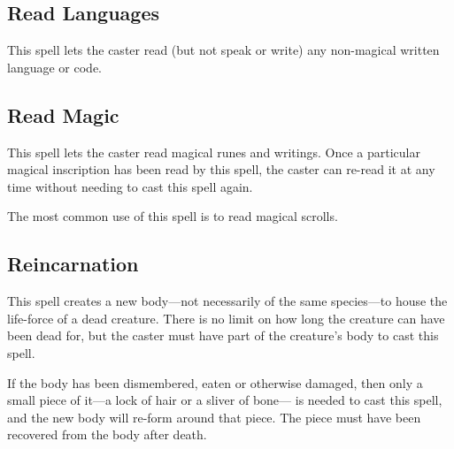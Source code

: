 \begin{multicols*}{2}
\subsection{Read Languages}\label{spell:Read Languages}

This spell lets the caster read (but not speak or write) any non-magical written language or code.

\subsection{Read Magic}\label{spell:Read Magic}

This spell lets the caster read magical runes and writings. Once a particular magical inscription has been read by this spell, the caster can re-read it at any time without needing to cast this spell again.

The most common use of this spell is to read magical scrolls.

\subsection{Reincarnation}\label{spell:Reincarnation}

This spell creates a new body—not necessarily of the same species—to house the life-force of a dead creature. There is no limit on how long the creature can have been dead for, but the caster must have part of the creature’s body to cast this spell.

If the body has been dismembered, eaten or otherwise damaged, then only a small piece of it—a lock of hair or a sliver of bone— is needed to cast this spell, and the new body will re-form around that piece. The piece must have been recovered from the body after death.


\end{multicols*}
